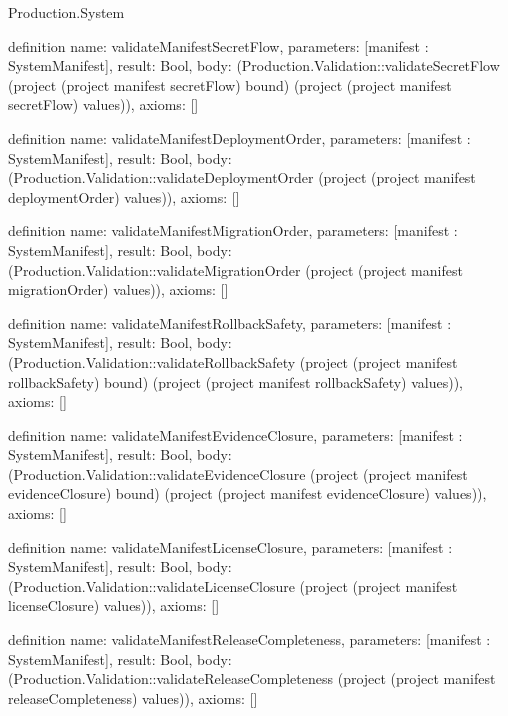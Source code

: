 \begin{lexlean}{Production.System}
\begin{semanticmodule}
definition{
  name: validateManifestSecretFlow,
  parameters: [manifest : SystemManifest],
  result: Bool,
  body: (Production.Validation::validateSecretFlow (project (project manifest secretFlow) bound) (project (project manifest secretFlow) values)),
  axioms: []
}

definition{
  name: validateManifestDeploymentOrder,
  parameters: [manifest : SystemManifest],
  result: Bool,
  body: (Production.Validation::validateDeploymentOrder (project (project manifest deploymentOrder) values)),
  axioms: []
}

definition{
  name: validateManifestMigrationOrder,
  parameters: [manifest : SystemManifest],
  result: Bool,
  body: (Production.Validation::validateMigrationOrder (project (project manifest migrationOrder) values)),
  axioms: []
}

definition{
  name: validateManifestRollbackSafety,
  parameters: [manifest : SystemManifest],
  result: Bool,
  body: (Production.Validation::validateRollbackSafety (project (project manifest rollbackSafety) bound) (project (project manifest rollbackSafety) values)),
  axioms: []
}

definition{
  name: validateManifestEvidenceClosure,
  parameters: [manifest : SystemManifest],
  result: Bool,
  body: (Production.Validation::validateEvidenceClosure (project (project manifest evidenceClosure) bound) (project (project manifest evidenceClosure) values)),
  axioms: []
}

definition{
  name: validateManifestLicenseClosure,
  parameters: [manifest : SystemManifest],
  result: Bool,
  body: (Production.Validation::validateLicenseClosure (project (project manifest licenseClosure) values)),
  axioms: []
}

definition{
  name: validateManifestReleaseCompleteness,
  parameters: [manifest : SystemManifest],
  result: Bool,
  body: (Production.Validation::validateReleaseCompleteness (project (project manifest releaseCompleteness) values)),
  axioms: []
}


\end{semanticmodule}
\end{lexlean}
